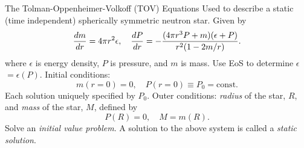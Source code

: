 \documentclass[handout]{beamer}
\newcommand{\Def}{\equiv}
\begin{document}
    \begin{frame}{The Tolman-Oppenheimer-Volkoff (TOV) Equations}
        \pause Used to describe a static (time independent) spherically symmetric neutron star. \pause Given by
        \begin{align*}
            \dv{m}{r} = 4\pi r^2 \epsilon, \quad \dv{P}{r} = -\frac{(4\pi r^3 P + m)(\epsilon + P)}{r^2 (1-2m/r)}.
        \end{align*}
        where $\epsilon$ is energy density, $P$ is pressure, and $m$ is mass. \pause Use EoS to determine $\epsilon~$\pause $=\epsilon(P)$. \pause Initial conditions: \pause
        \[m(r=0) = 0, \quad P(r=0) \Def P_0 = \text{const.}\]\pause
        Each solution uniquely specified by $P_0$. \pause Outer conditions: \pause \textit{radius} of the star, $R$\pause , and \textit{mass} of the star, $M$\pause , defined by \[P(R) = 0, \quad M = m(R).\] \pause
        Solve an \textit{initial value problem}. \pause A solution to the above system is called a \textit{static solution}.         %
    \end{frame}
\end{document}
